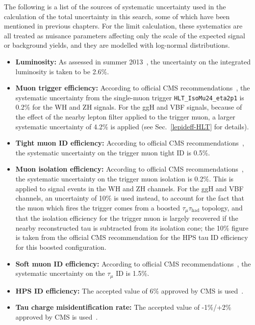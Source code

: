 The following is a list of the sources of systematic uncertainty used in the calculation of the total uncertainty in this search, some of which have been mentioned in previous chapters. For the limit calculation, these systematics are all treated as nuisance parameters affecting only the scale of the expected signal or background yields, and they are modelled with log-normal distributions.

\begin{itemize}
\item \textbf{Luminosity: } As assessed in summer 2013~\cite{CMS-PAS-LUM-13-001}, the uncertainty on the integrated luminosity is taken to be 2.6\%.
\item \textbf{Muon trigger efficiency: } According to official CMS recommendations~\cite{CMS:muonuncertaintytwiki}, the systematic uncertainty from the single-muon trigger \texttt{HLT\_IsoMu24\_eta2p1} is 0.2\% for the WH and ZH signals. For the ggH and VBF signals, because of the effect of the nearby lepton filter applied to the trigger muon, a larger systematic uncertainty of 4.2\% is applied (see Sec.~\ref{lepideff-HLT} for details).
\item \textbf{Tight muon ID efficiency: } According to official CMS recommendations~\cite{CMS:muonuncertaintytwiki}, the systematic uncertainty on the trigger muon tight ID is 0.5\%.
\item \textbf{Muon isolation efficiency: } According to official CMS recommendations~\cite{CMS:muonuncertaintytwiki}, the systematic uncertainty on the trigger muon isolation is 0.2\%. This is applied to signal events in the WH and ZH channels. For the ggH and VBF channels, an uncertainty of 10\% is used instead, to account for the fact that the muon which fires the trigger comes from a boosted $\tau_{\mu}\tau_{\text{had}}$ topology, and that the isolation efficiency for the trigger muon is largely recovered if the nearby reconstructed tau is subtracted from its isolation cone; the 10\% figure is taken from the official CMS recommendation for the HPS tau ID efficiency for this boosted configuration.
\item \textbf{Soft muon ID efficiency: } According to official CMS recommendations~\cite{CMS:muonuncertaintytwiki}, the systematic uncertainty on the $\tau_{\mu}$ ID is 1.5\%.
\item \textbf{HPS ID efficiency: } The accepted value of 6\% approved by CMS is used~\cite{CMS:tauuncertaintytwiki}.
\item \textbf{Tau charge misidentification rate: } The accepted value of -1\%/+2\% approved by CMS is used~\cite{CMS:tauuncertaintytwiki}.

\end{itemize}
